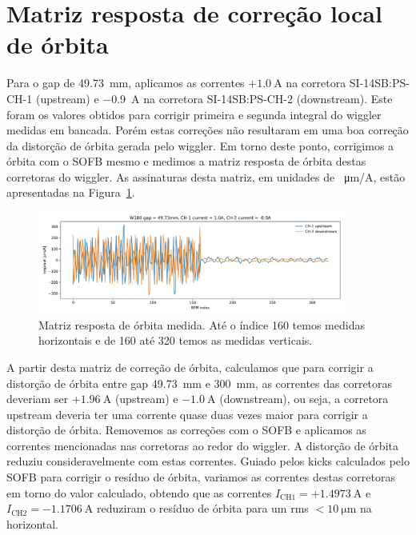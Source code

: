 \documentclass[a4paper,
               keeplastbox,   %
               ]{jacow}
\begin{document}
\section{Matriz resposta de correção local de órbita}
Para o gap de \SI{49.73}{\milli\meter}, aplicamos as correntes $+\SI{1.0}{\ampere}$ na corretora SI-14SB:PS-CH-1 (upstream) e \SI{-0.9}{\ampere} na corretora SI-14SB:PS-CH-2 (downstream). Este foram os valores obtidos para corrigir primeira e segunda integral do wiggler medidas em bancada. Porém estas correções não resultaram em uma boa correção da distorção de órbita gerada pelo wiggler. Em torno deste ponto, corrigimos a órbita com o SOFB mesmo e medimos a matriz resposta de órbita destas corretoras do wiggler. As assinaturas desta matriz, em unidades de \SI{}{\micro\meter/\ampere}, estão apresentadas na Figura~\ref{fig:respmat}.
\begin{figure}
    \centering
    \includegraphics*[width=0.9\textwidth]{respmat_gap49p73mm_Iup_pos1p0A_Idown_neg0p9.png}
    \caption{Matriz resposta de órbita medida. Até o índice 160 temos medidas horizontais e de 160 até 320 temos as medidas verticais.}
    \label{fig:respmat}
\end{figure}

A partir desta matriz de correção de órbita, calculamos que para corrigir a distorção de órbita entre gap \SI{49.73}{\milli\meter} e \SI{300}{\milli\meter}, as correntes das corretoras deveriam ser $+\SI{1.96}{\ampere}$ (upstream) e $\SI{-1.0}{\ampere}$ (downstream), ou seja, a corretora upstream deveria ter uma corrente quase duas vezes maior para corrigir a distorção de órbita. Removemos as correções com o SOFB e aplicamos as correntes mencionadas nas corretoras ao redor do wiggler. A distorção de órbita reduziu consideravelmente com estas correntes. Guiado pelos kicks calculados pelo SOFB para corrigir o resíduo de órbita, variamos as correntes destas corretoras em torno do valor calculado, obtendo que as correntes $I_{\mathrm{CH1}}=+\SI{1.4973}{\ampere}$ e $I_{\mathrm{CH2}}=\SI{-1.1706}{\ampere}$ reduziram o resíduo de órbita para um rms $<\SI{10}{\micro\meter}$ na horizontal.
\end{document}
